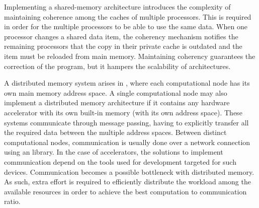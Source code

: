 \documentclass[../thesis]{subfiles}
\begin{document}
	Implementing a shared-memory \numa architecture introduces the complexity of maintaining coherence among the caches of multiple processors. This is required in order for the multiple processors to be able to use the same data. When one processor changes a shared data item, the coherency mechanism notifies the remaining processors that the copy in their private cache is outdated and the item must be reloaded from main memory. Maintaining coherency guarantees the correction of the program, but it hampers the scalability of \numa architectures.

	A distributed memory system arises in \hetplats, where each computational node has its own main memory address space. A single computational node may also implement a distributed memory architecture if it contains any hardware accelerator with its own built-in memory (with its own address space). These systems communicate through message passing, having to explicitly transfer all the required data between the multiple address spaces. Between distinct computational nodes, communication is usually done over a network connection using an \mpi library. In the case of accelerators, the solutions to implement communication depend on the tools used for development targeted for such devices. Communication becomes a possible bottleneck with distributed memory. As such, extra effort is required to efficiently distribute the workload among the available resources in order to achieve the best computation to communication ratio.
\end{document}

